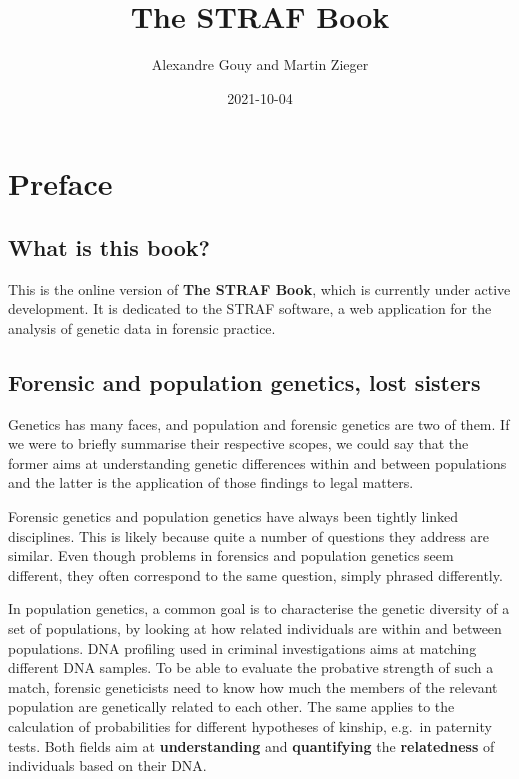 \documentclass[
]{book}
\title{The STRAF Book}
\author{Alexandre Gouy and Martin Zieger}
\date{2021-10-04}
\begin{document}
\maketitle

{
\setcounter{tocdepth}{1}
\tableofcontents
}
\hypertarget{preface}{%
\chapter*{Preface}\label{preface}}

\hypertarget{what-is-this-book}{%
\section*{What is this book?}\label{what-is-this-book}}

This is the online version of \textbf{The STRAF Book}, which is currently under
active development. It is dedicated to the STRAF software, a web application
for the analysis of genetic data in forensic practice.

\hypertarget{forensic-and-population-genetics-lost-sisters}{%
\section*{Forensic and population genetics, lost sisters}\label{forensic-and-population-genetics-lost-sisters}}

Genetics has many faces, and population and forensic genetics are two of them.
If we were to briefly summarise their respective scopes, we could say that the
former aims at understanding genetic differences within and between populations
and the latter is the application of those findings to legal matters.

Forensic genetics and population genetics have always been tightly linked
disciplines. This is likely because quite a number of questions they address
are similar. Even though problems in forensics and population genetics seem
different, they often correspond to the same question, simply phrased differently.

In population genetics, a common goal is to characterise the genetic diversity of a set of populations, by looking at how related individuals are within and between populations. DNA profiling used in criminal investigations aims at matching different DNA samples. To be able to evaluate the probative strength of such a match, forensic geneticists need to know how much the members of the relevant population are genetically related to each other. The same applies to the calculation of probabilities for different hypotheses of kinship, e.g.~in paternity tests. Both fields aim at \textbf{understanding} and \textbf{quantifying} the \textbf{relatedness} of individuals based on their DNA.
\end{document}

